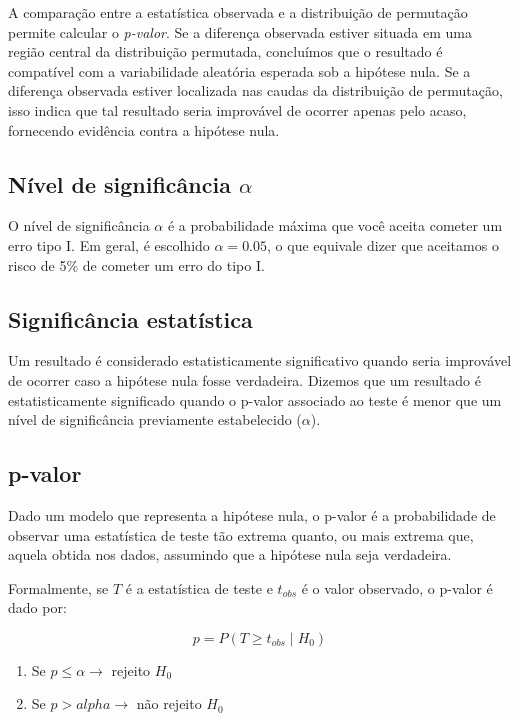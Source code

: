 \documentclass{article}
\begin{document}
A comparação entre a estatística observada e a distribuição de permutação permite calcular o \textit{p-valor}. Se a diferença observada estiver situada em uma região central da distribuição permutada, concluímos que o resultado é compatível com a variabilidade aleatória esperada sob a hipótese nula. Se a diferença observada estiver localizada nas caudas da distribuição de permutação, isso indica que tal resultado seria improvável de ocorrer apenas pelo acaso, fornecendo evidência contra a hipótese nula.

\subsection{Nível de significância \texorpdfstring{$\alpha$}{α}}

O nível de significância $\alpha$ é a probabilidade máxima que você aceita cometer um erro tipo I. Em geral, é escolhido $\alpha = 0.05$, o que equivale dizer que aceitamos o risco de 5\% de cometer um erro do tipo I.

\subsection{Significância estatística}

Um resultado é considerado estatisticamente significativo quando seria improvável de ocorrer caso a hipótese nula fosse verdadeira. Dizemos que um resultado é estatisticamente significado quando o p-valor associado ao teste é menor que um nível de significância previamente estabelecido ($\alpha$).

\subsection{p-valor}

Dado um modelo que representa a hipótese nula, o p-valor é a probabilidade de observar uma estatística de teste tão extrema quanto, ou mais extrema que, aquela obtida nos dados, assumindo que a hipótese nula seja verdadeira. 

Formalmente, se $T$ é a estatística de teste e $t_{obs}$ é o valor observado, o p-valor é dado por:

\begin{equation}
    p = P(T \ge t_{obs} \mid H_0)
\end{equation}

\begin{enumerate}
    \item Se $p \leq \alpha \rightarrow$ rejeito $H_0$
    \item Se $p > alpha \rightarrow$ não rejeito $H_0$
\end{enumerate}
\end{document}
